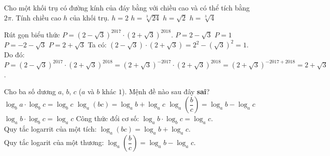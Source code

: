 \begin{ex}%
 Cho một khối trụ có đường kính của đáy bằng với chiều cao và có thể tích bằng $2\pi$. Tính chiều cao $h$ của khối trụ.
 \choice
  {\True $h = 2$}
  {$h = \sqrt[3]{24}$}
  {$h = \sqrt{2}$}
  {$h = \sqrt[3]{4}$}
\end{ex}


\begin{ex}%
 Rút gọn biểu thức $P = \left(2 - \sqrt{3}\right)^{2017} \cdot \left(2 + \sqrt{3}\right)^{2018}$.
 \choice
  {$P = 2 - \sqrt{3}$}
  {$P = 1$}
  {$P = -2 - \sqrt{3}$}
  {\True $P = 2 + \sqrt{3}$}
 \loigiai
  {
  Ta có: $\left(2 - \sqrt{3}\right) \cdot \left(2 + \sqrt{3}\right) = 2^2 - (\sqrt{3})^2 = 1$.\\
  Do đó:\\
  $P = \left(2 - \sqrt{3}\right)^{2017} \cdot \left(2 + \sqrt{3}\right)^{2018} = \left(2 + \sqrt{3}\right)^{-2017} \cdot \left(2 + \sqrt{3}\right)^{2018} = \left(2 + \sqrt{3}\right)^{-2017+2018} = 2 + \sqrt{3}$.
  }
\end{ex}


\begin{ex}%
 Cho ba số dương $a$, $b$, $c$ ($a$ và $b$ khác $1$). Mệnh đề nào sau đây \textbf{sai}?
 \choice
  {\True $\log_b a \cdot \log_b c = \log_b c$}
  {$\log_a (bc) = \log_a b + \log_a c$}
  {$\log_a \left( \dfrac{b}{c}\right) = \log_a b - \log_a c$}
  {$\log_a b \cdot \log_b c = \log_a c$}
 \loigiai
  {
  Công thức đổi cơ số: $\log_a b \cdot \log_b c = \log_a c$.\\
  Quy tắc logarrit của một tích: $\log_a (bc) = \log_a b + \log_a c$.\\
  Quy tắc logarit của một thương: $\log_a \left( \dfrac{b}{c}\right) = \log_a b - \log_a c$.
  }
\end{ex}


